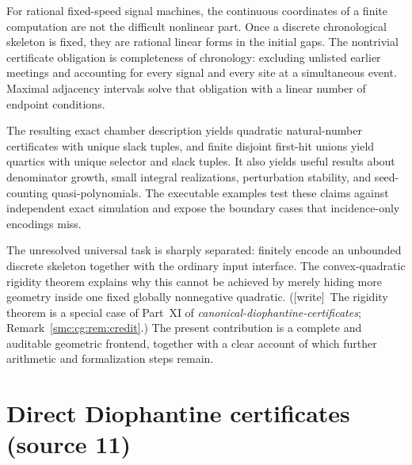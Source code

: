 \documentclass[11pt,letterpaper]{article}
\numberwithin{equation}{section}
\theoremstyle{definition}
\theoremstyle{remark}
\newcommand{\wtag}{\textup{[write]}}
\begin{document}
For rational fixed-speed signal machines, the continuous coordinates of a
finite computation are not the difficult nonlinear part. Once a discrete
chronological skeleton is fixed, they are rational linear forms in the
initial gaps. The nontrivial certificate obligation is completeness of
chronology: excluding unlisted earlier meetings and accounting for every
signal and every site at a simultaneous event. Maximal adjacency intervals
solve that obligation with a linear number of endpoint conditions.

The resulting exact chamber description yields quadratic natural-number
certificates with unique slack tuples, and finite disjoint first-hit unions
yield quartics with unique selector and slack tuples. It also yields useful
results about denominator growth, small integral realizations, perturbation
stability, and seed-counting quasi-polynomials. The executable examples test
these claims against independent exact simulation and expose the boundary
cases that incidence-only encodings miss.

The unresolved universal task is sharply separated: finitely encode an
unbounded discrete skeleton together with the ordinary input interface.
The convex-quadratic rigidity theorem explains why this cannot be achieved
by merely hiding more geometry inside one fixed globally nonnegative
quadratic. (\wtag\ The rigidity theorem is a special case of Part~XI of \emph{canonical-diophantine-certificates}; Remark~\ref{smc:cg:rem:credit}.) The present contribution is a complete and auditable geometric
frontend, together with a clear account of which further arithmetic and
formalization steps remain.

\part{Direct Diophantine certificates (source 11)}\label{smc:part:sd}
\end{document}
